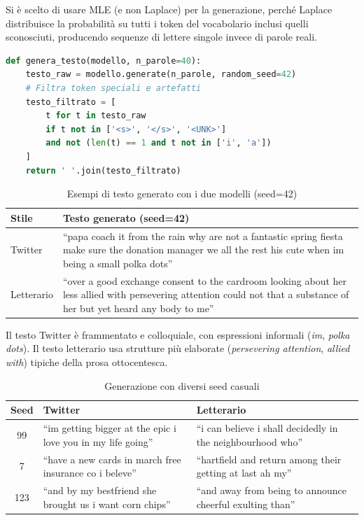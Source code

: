 \documentclass[12pt, a4paper]{article}
\begin{document}
Si è scelto di usare MLE (e non Laplace) per la generazione, perché
Laplace distribuisce la probabilità su tutti i token del vocabolario
inclusi quelli sconosciuti, producendo sequenze di lettere singole
invece di parole reali.

\begin{lstlisting}[language=Python, caption=Generazione del testo]
def genera_testo(modello, n_parole=40):
    testo_raw = modello.generate(n_parole, random_seed=42)
    # Filtra token speciali e artefatti
    testo_filtrato = [
        t for t in testo_raw
        if t not in ['<s>', '</s>', '<UNK>']
        and not (len(t) == 1 and t not in ['i', 'a'])
    ]
    return ' '.join(testo_filtrato)
\end{lstlisting}

\begin{table}[H]
\centering
\begin{tabular}{p{2.2cm}p{10cm}}
\toprule
\textbf{Stile} & \textbf{Testo generato (seed=42)} \\
\midrule
Twitter &
``papa coach it from the rain why are not a fantastic spring
fiesta make sure the donation manager we all the rest his cute
when im being a small polka dots'' \\[0.5cm]
Letterario &
``over a good exchange consent to the cardroom looking about
her less allied with persevering attention could not that a
substance of her but yet heard any body to me'' \\
\bottomrule
\end{tabular}
\caption{Esempi di testo generato con i due modelli (seed=42)}
\end{table}

Il testo Twitter è frammentato e colloquiale, con espressioni
informali (\textit{im}, \textit{polka dots}). Il testo letterario
usa strutture più elaborate (\textit{persevering attention},
\textit{allied with}) tipiche della prosa ottocentesca.

\begin{table}[H]
\centering
\begin{tabular}{cp{5.5cm}p{5.5cm}}
\toprule
\textbf{Seed} & \textbf{Twitter} & \textbf{Letterario} \\
\midrule
99  & ``im getting bigger at the epic i love you in my life going'' &
      ``i can believe i shall decidedly in the neighbourhood who'' \\
7   & ``have a new cards in march free insurance co i beleve'' &
      ``hartfield and return among their getting at last ah my'' \\
123 & ``and by my bestfriend she brought us i want corn chips'' &
      ``and away from being to announce cheerful exulting than'' \\
\bottomrule
\end{tabular}
\caption{Generazione con diversi seed casuali}
\end{table}
\end{document}
